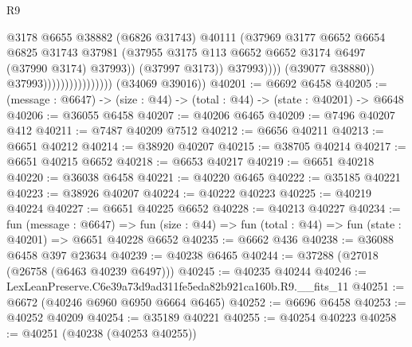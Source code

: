 \begin{lexlean}{R9}
\begin{coremodule}
                                                  @3178
                                                  @6655
                                                  @38882
                                                  (@6826 @31743)
                                                  @40111
                                                  (@37969
                                                    @3177
                                                    @6652
                                                    @6654
                                                    @6825
                                                    @31743
                                                    @37981
                                                    (@37955
                                                      @3175
                                                      @113
                                                      @6652
                                                      @6652
                                                      @3174
                                                      @6497
                                                      (@37990 @3174)
                                                      @37993))
                                                  (@37997 @3173))
                                                @37993))))
                                        (@39077 @38880))
                                      @37993))))))))))))))))
      (@34069 @39016))
@40201 := @6692 @6458
@40205 := (message : @6647) -> (size : @44) -> (total : @44) -> (state : @40201) -> @6648
@40206 := @36055 @6458
@40207 := @40206 @6465
@40209 := @7496 @40207 @412
@40211 := @7487 @40209 @7512
@40212 := @6656 @40211
@40213 := @6651 @40212
@40214 := @38920 @40207
@40215 := @38705 @40214
@40217 := @6651 @40215 @6652
@40218 := @6653 @40217
@40219 := @6651 @40218
@40220 := @36038 @6458
@40221 := @40220 @6465
@40222 := @35185 @40221
@40223 := @38926 @40207
@40224 := @40222 @40223
@40225 := @40219 @40224
@40227 := @6651 @40225 @6652
@40228 := @40213 @40227
@40234 := fun (message : @6647) =>
  fun (size : @44) => fun (total : @44) => fun (state : @40201) => @6651 @40228 @6652
@40235 := @6662 @436
@40238 := @36088 @6458 @397 @23634
@40239 := @40238 @6465
@40244 := @37288 (@27018 (@26758 (@6463 @40239 @6497)))
@40245 := @40235 @40244
@40246 := LexLeanPreserve.C6e39a73d9ad311fe5eda82b921ca160b.R9.__fits_11
@40251 := @6672 (@40246 @6960 @6950 @6664 @6465)
@40252 := @6696 @6458
@40253 := @40252 @40209
@40254 := @35189 @40221
@40255 := @40254 @40223
@40258 := @40251 (@40238 (@40253 @40255))

\end{coremodule}
\end{lexlean}
